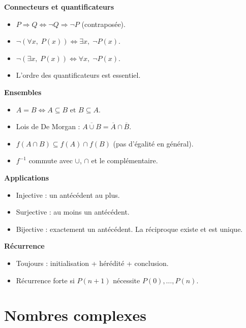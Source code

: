 \documentclass[11pt,a4paper,twoside]{book}
\begin{document}
\begin{retenirbox}
\textbf{Connecteurs et quantificateurs}
\begin{itemize}
  \item $P \Rightarrow Q \Leftrightarrow \neg Q \Rightarrow \neg P$ (contraposée).
  \item $\neg(\forall x,\; P(x)) \Leftrightarrow \exists x,\; \neg P(x)$.
  \item $\neg(\exists x,\; P(x)) \Leftrightarrow \forall x,\; \neg P(x)$.
  \item L'ordre des quantificateurs est essentiel.
\end{itemize}

\textbf{Ensembles}
\begin{itemize}
  \item $A = B \Leftrightarrow A \subseteq B \text{ et } B \subseteq A$.
  \item Lois de De Morgan : $\overline{A \cup B} = \overline{A} \cap \overline{B}$.
  \item $f(A \cap B) \subseteq f(A) \cap f(B)$ (pas d'égalité en général).
  \item $f^{-1}$ commute avec $\cup$, $\cap$ et le complémentaire.
\end{itemize}

\textbf{Applications}
\begin{itemize}
  \item Injective : un antécédent au plus.
  \item Surjective : au moins un antécédent.
  \item Bijective : exactement un antécédent. La réciproque existe et est unique.
\end{itemize}

\textbf{Récurrence}
\begin{itemize}
  \item Toujours : initialisation + hérédité + conclusion.
  \item Récurrence forte si $P(n+1)$ nécessite $P(0), \ldots, P(n)$.
\end{itemize}
\end{retenirbox}


\chapter{Nombres complexes}
\end{document}
